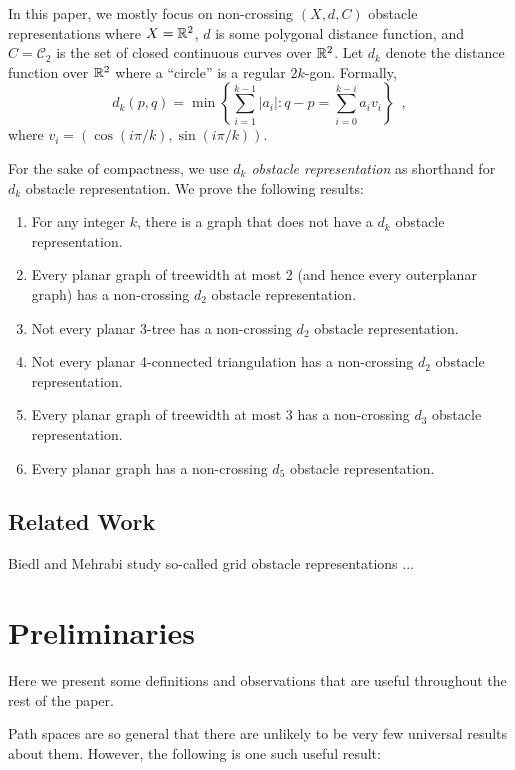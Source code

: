 \documentclass{patmorin}
\begin{document}
In this paper, we mostly focus on non-crossing $(X,d,C)$ obstacle
representations where $X=\mathbb{R}^2$, $d$ is some polygonal distance function,
and $C=\mathcal{C}_2$ is the set of closed continuous curves over $\mathbb{R}^2$.
Let $d_k$ denote the distance function over $\mathbb{R}^2$ where a ``circle''
is a regular $2k$-gon.  Formally,
\[  
   d_k(p,q)=\min\left\{\sum_{i=1}^{k-1}|a_i|: 
                        q-p=\sum_{i=0}^{k-i}a_iv_i\right\} \enspace ,
\]
where $v_i=(\cos(i\pi/k), \sin(i\pi/k))$. 

For the sake of compactness, we use \emph{$d_k$ obstacle representation}
as shorthand for $d_k$ obstacle representation.
We prove the following results:
\begin{enumerate}
   \item For any integer $k$, there is a graph that does not have a
     $d_k$ obstacle representation.
   \item Every planar graph of treewidth at most 2 (and hence every
     outerplanar graph) has a non-crossing $d_2$ obstacle
     representation.
   \item Not every planar 3-tree has a non-crossing $d_2$
     obstacle representation.
   \item Not every planar 4-connected triangulation has a 
     non-crossing $d_2$ obstacle representation.
   \item Every planar graph of treewidth at most 3 has a 
     non-crossing $d_3$ obstacle representation.
   \item Every planar graph has a non-crossing $d_5$
     obstacle representation.
\end{enumerate}

\subsection{Related Work}

Biedl and Mehrabi study so-called grid obstacle representations \cite{X}...


\section{Preliminaries}

Here we present some definitions and observations that are useful
throughout the rest of the paper.  

Path spaces are so general that there are unlikely to be very few
universal results about them.  However, the following is one such
useful result:
\end{document}
